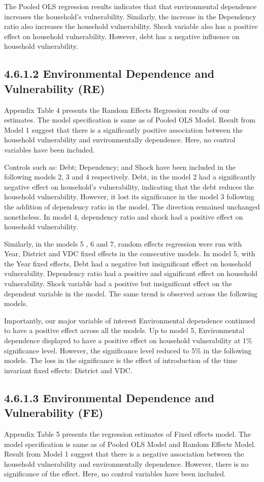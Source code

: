The Pooled OLS regression results indicates that that environmental dependence increases the household's vulnerability. Similarly, the increase in the Dependency ratio also increases the household vulnerability. Shock variable also has a positive effect on household vulnerability. However, debt has a negative influence on household vulnerability.  

\subsection*{4.6.1.2 Environmental Dependence and Vulnerability (RE)}
Appendix Table 4 presents the Random Effects Regression results of our estimates. The model specification is same as of Pooled OLS Model. Result from Model 1 suggest that there is a significantly positive association between the household vulnerability and environmentally dependence. Here, no control variables have been included.  

Controls such as: Debt; Dependency; and Shock have been included in the following models 2, 3 and 4 respectively. Debt, in the model 2 had a significantly negative effect on household's vulnerability, indicating that the debt reduces the household vulnerability. However, it lost its significance in the model 3 following the addition of dependency ratio in the model. The direction remained unchanged nonetheless. In model 4, dependency ratio and shock had a positive effect on household vulnerability.

Similarly, in the models 5 , 6 and 7, random effects regression were run with Year, District and VDC fixed effects in the consecutive models. In model 5, with the Year fixed effects, Debt had a negative but insignificant effect on household vulnerability. Dependency ratio had a positive and significant effect on household vulnerability. Shock variable had a positive but insignificant effect on the dependent variable in the model. The same trend is observed across the following models. 

Importantly, our major variable of interest Environmental dependence continued to have a positive effect across all the models.  Up to model 5, Environmental dependence displayed to have a positive effect on household vulnerability at 1\% significance level. However, the significance level reduced to 5\% in the following models. The loss in the significance is the effect of introduction of the time invariant fixed effects: District and VDC.

\subsection*{4.6.1.3 Environmental Dependence and Vulnerability (FE)}
Appendix Table 5 presents the regression estimates of Fixed effects model. The model specification is same as of Pooled OLS Model and Random Effects Model. Result from Model 1 suggest that there is a negative association between the household vulnerability and environmentally dependence. However, there is no significance of the effect. Here, no control variables have been included.  

